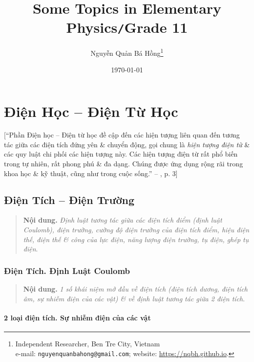 \documentclass[oneside]{book}
\title{Some Topics in Elementary Physics\texttt{/}Grade 11}
\author{Nguyễn Quản Bá Hồng\footnote{Independent Researcher, Ben Tre City, Vietnam\\e-mail: \texttt{nguyenquanbahong@gmail.com}; website: \url{https://nqbh.github.io}.}}
\date{\today}
\numberwithin{equation}{section}
\begin{document}
\frontmatter
\maketitle
\setcounter{secnumdepth}{4}
\setcounter{tocdepth}{3}
\tableofcontents
\newpage


\mainmatter
\part{Điện Học -- Điện Từ Học}
[``Phần Điện học -- Điện từ học đề cập đến các hiện tượng liên quan đến tương tác giữa các điện tích đứng yên \& chuyển động, gọi chung là \textit{hiện tượng điện từ} \& các quy luật chi phối các hiện tượng này. Các hiện tượng điện từ rất phổ biến trong tự nhiên, rất phong phú \& đa dạng. Chúng được ứng dụng rộng rãi trong khoa học \& kỹ thuật, cũng như trong cuộc sống.'' -- \cite{SGK_Vat_Ly_11_nang_cao}, p. 3]



\chapter{Điện Tích -- Điện Trường}

\begin{quotation}
	\textbf{Nội dung.} \textit{Định luật tương tác giữa các điện tích điểm (định luật Coulomb), điện trường, cường độ điện trường của điện tích điểm, hiệu điện thế, điện thế \& công của lực điện, năng lượng điện trường, tụ điện, ghép tụ điện}.
\end{quotation}

\section{Điện Tích. Định Luật Coulomb}
\begin{quotation}
	\textbf{Nội dung.} \textit{1 số khái niệm mở đầu về điện tích (điện tích dương, điện tích âm, sự nhiễm điện của các vật) \& về định luật tương tác giữa 2 điện tích}.
\end{quotation}

\subsection{2 loại điện tích. Sự nhiễm điện của các vật}
\end{document}
